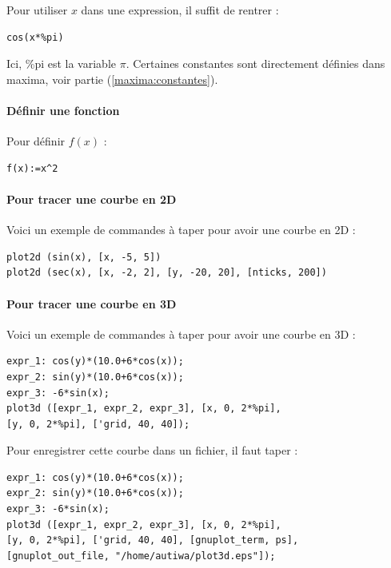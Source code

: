 \documentclass[a4paper,twoside]{article}
\begin{document}
Pour utiliser $x$ dans une expression, il suffit de rentrer :

\begin{verbatim}
cos(x*%pi)
\end{verbatim}

\begin{remarque}
Ici, \%pi est la variable $\pi$. Certaines constantes sont directement définies dans maxima, voir partie (\ref{maxima:constantes}).
\end{remarque}

\paragraph{Définir une fonction}
Pour définir $f(x)$ :
\begin{verbatim}
f(x):=x^2
\end{verbatim}


\paragraph{Pour tracer une courbe en 2D}

Voici un exemple de commandes à taper pour avoir une courbe en 2D :

\begin{verbatim}
plot2d (sin(x), [x, -5, 5])
plot2d (sec(x), [x, -2, 2], [y, -20, 20], [nticks, 200])
\end{verbatim}

\paragraph{Pour tracer une courbe en 3D}

Voici un exemple de commandes à taper pour avoir une courbe en 3D :

\begin{verbatim}
expr_1: cos(y)*(10.0+6*cos(x));
expr_2: sin(y)*(10.0+6*cos(x));
expr_3: -6*sin(x);
plot3d ([expr_1, expr_2, expr_3], [x, 0, 2*%pi],
[y, 0, 2*%pi], ['grid, 40, 40]);
\end{verbatim}

Pour enregistrer cette courbe dans un fichier, il faut taper :

\begin{verbatim}
expr_1: cos(y)*(10.0+6*cos(x));
expr_2: sin(y)*(10.0+6*cos(x));
expr_3: -6*sin(x);
plot3d ([expr_1, expr_2, expr_3], [x, 0, 2*%pi],
[y, 0, 2*%pi], ['grid, 40, 40], [gnuplot_term, ps],
[gnuplot_out_file, "/home/autiwa/plot3d.eps"]);
\end{verbatim}
\end{document}
